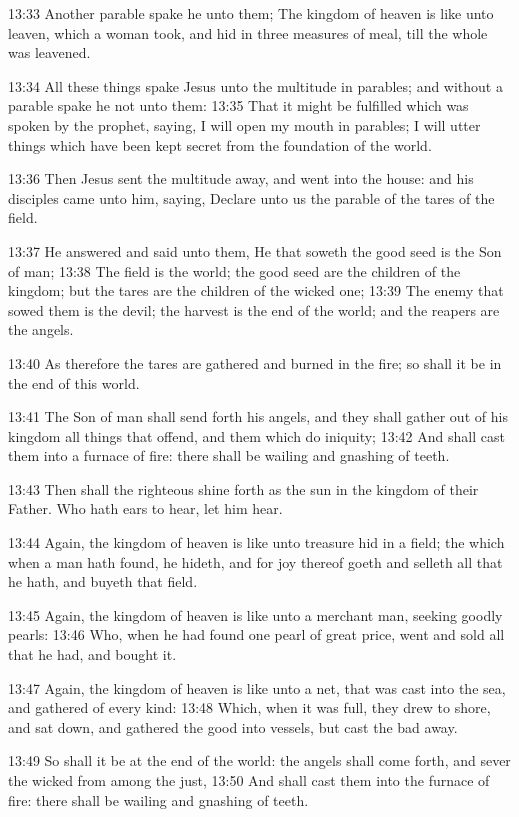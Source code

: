 13:33 Another parable spake he unto them; The kingdom of heaven is
like unto leaven, which a woman took, and hid in three measures of
meal, till the whole was leavened.

13:34 All these things spake Jesus unto the multitude in parables; and
without a parable spake he not unto them: 13:35 That it might be
fulfilled which was spoken by the prophet, saying, I will open my
mouth in parables; I will utter things which have been kept secret
from the foundation of the world.

13:36 Then Jesus sent the multitude away, and went into the house: and
his disciples came unto him, saying, Declare unto us the parable of
the tares of the field.

13:37 He answered and said unto them, He that soweth the good seed is
the Son of man; 13:38 The field is the world; the good seed are the
children of the kingdom; but the tares are the children of the wicked
one; 13:39 The enemy that sowed them is the devil; the harvest is the
end of the world; and the reapers are the angels.

13:40 As therefore the tares are gathered and burned in the fire; so
shall it be in the end of this world.

13:41 The Son of man shall send forth his angels, and they shall
gather out of his kingdom all things that offend, and them which do
iniquity; 13:42 And shall cast them into a furnace of fire: there
shall be wailing and gnashing of teeth.

13:43 Then shall the righteous shine forth as the sun in the kingdom
of their Father. Who hath ears to hear, let him hear.

13:44 Again, the kingdom of heaven is like unto treasure hid in a
field; the which when a man hath found, he hideth, and for joy thereof
goeth and selleth all that he hath, and buyeth that field.

13:45 Again, the kingdom of heaven is like unto a merchant man,
seeking goodly pearls: 13:46 Who, when he had found one pearl of great
price, went and sold all that he had, and bought it.

13:47 Again, the kingdom of heaven is like unto a net, that was cast
into the sea, and gathered of every kind: 13:48 Which, when it was
full, they drew to shore, and sat down, and gathered the good into
vessels, but cast the bad away.

13:49 So shall it be at the end of the world: the angels shall come
forth, and sever the wicked from among the just, 13:50 And shall cast
them into the furnace of fire: there shall be wailing and gnashing of
teeth.

